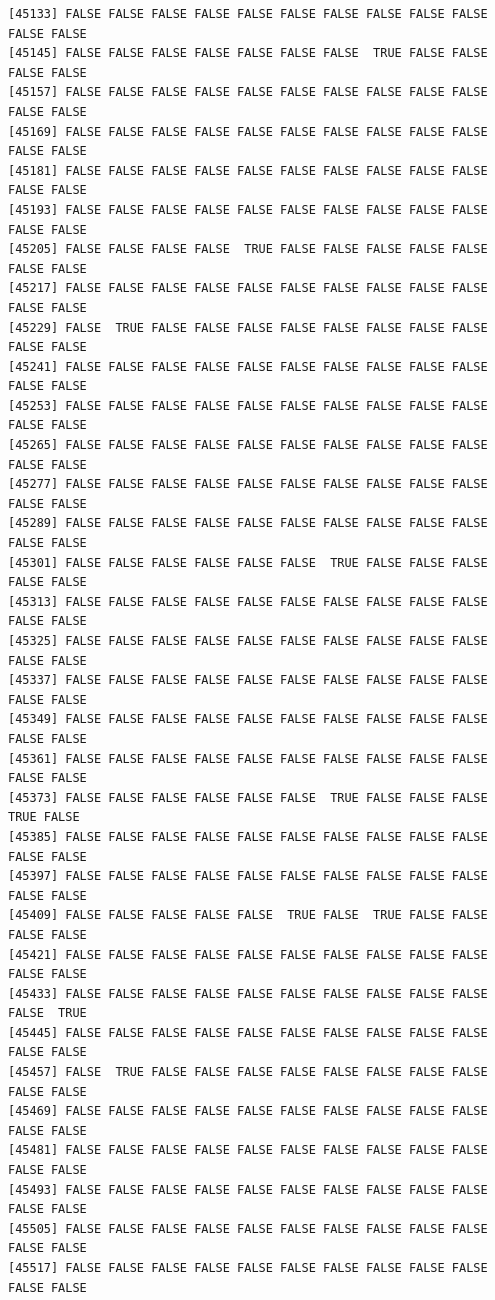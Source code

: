 \documentclass[
  a4paper,
  DIV=11,
  numbers=noendperiod]{scrartcl}
\begin{document}
\begin{verbatim}
[45133] FALSE FALSE FALSE FALSE FALSE FALSE FALSE FALSE FALSE FALSE FALSE FALSE
[45145] FALSE FALSE FALSE FALSE FALSE FALSE FALSE  TRUE FALSE FALSE FALSE FALSE
[45157] FALSE FALSE FALSE FALSE FALSE FALSE FALSE FALSE FALSE FALSE FALSE FALSE
[45169] FALSE FALSE FALSE FALSE FALSE FALSE FALSE FALSE FALSE FALSE FALSE FALSE
[45181] FALSE FALSE FALSE FALSE FALSE FALSE FALSE FALSE FALSE FALSE FALSE FALSE
[45193] FALSE FALSE FALSE FALSE FALSE FALSE FALSE FALSE FALSE FALSE FALSE FALSE
[45205] FALSE FALSE FALSE FALSE  TRUE FALSE FALSE FALSE FALSE FALSE FALSE FALSE
[45217] FALSE FALSE FALSE FALSE FALSE FALSE FALSE FALSE FALSE FALSE FALSE FALSE
[45229] FALSE  TRUE FALSE FALSE FALSE FALSE FALSE FALSE FALSE FALSE FALSE FALSE
[45241] FALSE FALSE FALSE FALSE FALSE FALSE FALSE FALSE FALSE FALSE FALSE FALSE
[45253] FALSE FALSE FALSE FALSE FALSE FALSE FALSE FALSE FALSE FALSE FALSE FALSE
[45265] FALSE FALSE FALSE FALSE FALSE FALSE FALSE FALSE FALSE FALSE FALSE FALSE
[45277] FALSE FALSE FALSE FALSE FALSE FALSE FALSE FALSE FALSE FALSE FALSE FALSE
[45289] FALSE FALSE FALSE FALSE FALSE FALSE FALSE FALSE FALSE FALSE FALSE FALSE
[45301] FALSE FALSE FALSE FALSE FALSE FALSE  TRUE FALSE FALSE FALSE FALSE FALSE
[45313] FALSE FALSE FALSE FALSE FALSE FALSE FALSE FALSE FALSE FALSE FALSE FALSE
[45325] FALSE FALSE FALSE FALSE FALSE FALSE FALSE FALSE FALSE FALSE FALSE FALSE
[45337] FALSE FALSE FALSE FALSE FALSE FALSE FALSE FALSE FALSE FALSE FALSE FALSE
[45349] FALSE FALSE FALSE FALSE FALSE FALSE FALSE FALSE FALSE FALSE FALSE FALSE
[45361] FALSE FALSE FALSE FALSE FALSE FALSE FALSE FALSE FALSE FALSE FALSE FALSE
[45373] FALSE FALSE FALSE FALSE FALSE FALSE  TRUE FALSE FALSE FALSE  TRUE FALSE
[45385] FALSE FALSE FALSE FALSE FALSE FALSE FALSE FALSE FALSE FALSE FALSE FALSE
[45397] FALSE FALSE FALSE FALSE FALSE FALSE FALSE FALSE FALSE FALSE FALSE FALSE
[45409] FALSE FALSE FALSE FALSE FALSE  TRUE FALSE  TRUE FALSE FALSE FALSE FALSE
[45421] FALSE FALSE FALSE FALSE FALSE FALSE FALSE FALSE FALSE FALSE FALSE FALSE
[45433] FALSE FALSE FALSE FALSE FALSE FALSE FALSE FALSE FALSE FALSE FALSE  TRUE
[45445] FALSE FALSE FALSE FALSE FALSE FALSE FALSE FALSE FALSE FALSE FALSE FALSE
[45457] FALSE  TRUE FALSE FALSE FALSE FALSE FALSE FALSE FALSE FALSE FALSE FALSE
[45469] FALSE FALSE FALSE FALSE FALSE FALSE FALSE FALSE FALSE FALSE FALSE FALSE
[45481] FALSE FALSE FALSE FALSE FALSE FALSE FALSE FALSE FALSE FALSE FALSE FALSE
[45493] FALSE FALSE FALSE FALSE FALSE FALSE FALSE FALSE FALSE FALSE FALSE FALSE
[45505] FALSE FALSE FALSE FALSE FALSE FALSE FALSE FALSE FALSE FALSE FALSE FALSE
[45517] FALSE FALSE FALSE FALSE FALSE FALSE FALSE FALSE FALSE FALSE FALSE FALSE

\end{verbatim}
\end{document}
